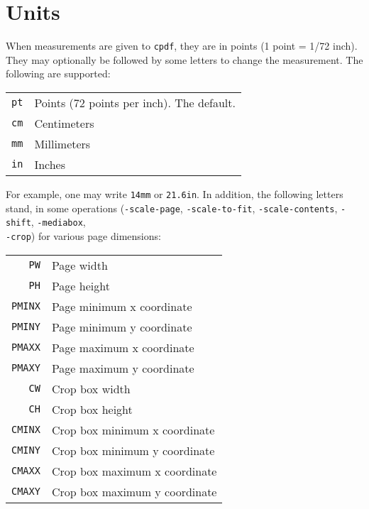 \documentclass{book}
\newcommand{\cpdf}{\texttt{cpdf}}
\begin{document}
\section{Units}
When measurements are given to \cpdf, they are in points (1 point = 1/72 inch). They may optionally
be followed by some letters to change the measurement. The following are
supported:

\begin{table}[h]
\centering
\begin{tabular}{rl}
  \texttt{pt} & Points (72 points per inch). The default. \\
  \texttt{cm} & Centimeters \\
  \texttt{mm} & Millimeters \\
  \texttt{in} & Inches \\
\end{tabular}
\end{table}

\noindent For example, one may write \texttt{14mm} or \texttt{21.6in}. In addition, the following letters stand, in some operations (\texttt{-scale-page}, \texttt{-scale-to-fit}, \texttt{-scale-contents}, \texttt{-shift}, \texttt{-mediabox},\\ \texttt{-crop}) for various page dimensions:

\begin{table}[h]
\centering
\begin{tabular}{rl}
  \texttt{PW} & Page width\\
  \texttt{PH} & Page height\\
  \texttt{PMINX} & Page minimum x coordinate\\
  \texttt{PMINY} & Page minimum y coordinate\\
  \texttt{PMAXX} & Page maximum x coordinate\\
  \texttt{PMAXY} & Page maximum y coordinate\\
  \texttt{CW} & Crop box width\\
  \texttt{CH} & Crop box height\\
  \texttt{CMINX} & Crop box minimum x coordinate\\
  \texttt{CMINY} & Crop box minimum y coordinate\\
  \texttt{CMAXX} & Crop box maximum x coordinate\\
  \texttt{CMAXY} & Crop box maximum y coordinate
\end{tabular}
\end{table}
\end{document}
